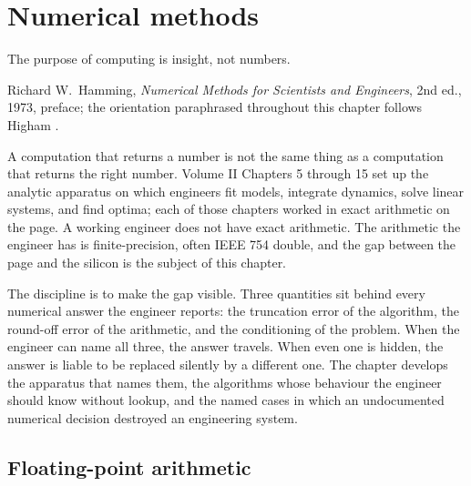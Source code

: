 \chapter{Numerical methods}
\label{vol02:ch16}

\epigraph{The purpose of computing is insight, not numbers.}{Richard
W.\ Hamming, \emph{Numerical Methods for Scientists and Engineers},
2nd ed., 1973, preface; the orientation paraphrased throughout this
chapter follows Higham
\cite[ch.~1]{text:higham-numerical}.}


\noindent
A computation that returns a number is not the same thing as a
computation that returns the right number. Volume II Chapters 5
through 15 set up the analytic apparatus on which engineers fit
models, integrate dynamics, solve linear systems, and find optima;
each of those chapters worked in exact arithmetic on the page. A
working engineer does not have exact arithmetic. The arithmetic the
engineer has is finite-precision, often IEEE 754 double, and the
gap between the page and the silicon is the subject of this chapter.

The discipline is to make the gap visible. Three quantities sit
behind every numerical answer the engineer reports: the truncation
error of the algorithm, the round-off error of the arithmetic, and
the conditioning of the problem. When the engineer can name all
three, the answer travels. When even one is hidden, the answer is
liable to be replaced silently by a different one. The chapter
develops the apparatus that names them, the algorithms whose
behaviour the engineer should know without lookup, and the named
cases in which an undocumented numerical decision destroyed an
engineering system.

\section{Floating-point arithmetic}

